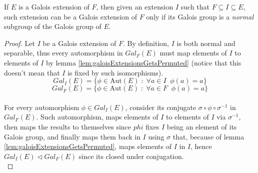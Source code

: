 \begin{lemma}
    \label{lem:normalSubgroupGaloisExtension}
    If $E$ is a Galois extension of $F$, then given an extension $I$ such that 
    $F \subseteq I \subseteq E$, such extension can be a Galois extension of $F$  
    only if its Galois group is a \emph{normal} subgroup of the Galois group of $E$.
\end{lemma}
\begin{proof}
    Let $I$ be a Galois extension of $F$. By definition, $I$ is both normal and separable, 
    thus every automorphism in $Gal_{F}(E)$ must map elements of $I$ to elements of $I$ by 
    lemma \ref{lem:galoisExtensionsGetsPermuted} (notice that this doesn't mean that $I$ is 
    fixed by such isomorphisms).\\

    $$ Gal_{I}(E) = \{ \phi \in \text{Aut}(E) \;:\; \forall a \in I \;\; \phi(a) = a \} $$ 
    $$ Gal_{F}(E) = \{ \phi \in \text{Aut}(E) \;:\; \forall a \in F \;\; \phi(a) = a \} $$ \\

    For every automorphism $\phi \in Gal_{I}(E)$, consider its conjugate 
    $\sigma \circ \phi \circ \sigma^{-1}$ in $Gal_{F}(E)$. Such automorphism, maps elements 
    of $I$ to elements of $I$ via $\sigma^{-1}$, then maps the results to themselves since $phi$
    fixes $I$ being an element of its Galois group, and finally maps them back in $I$ 
    using $\sigma$ that, because of lemma \ref{lem:galoisExtensionsGetsPermuted}, maps elements
    of $I$ in $I$, hence $Gal_{I}(E) \triangleleft Gal_{F}(E)$ since its closed under conjugation. \\

\end{proof} \vspace{0.2em}

\newpage

